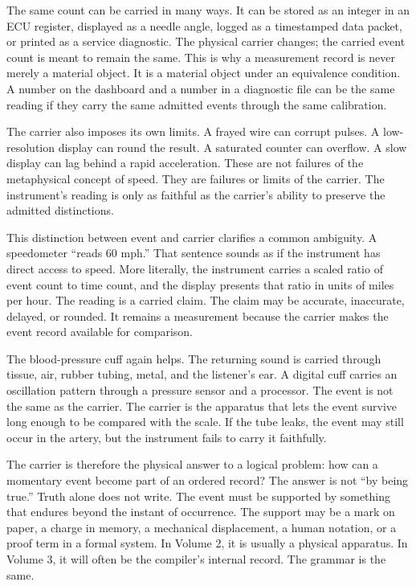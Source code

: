 The same count can be carried in many ways. It can be stored as an integer in an
ECU register, displayed as a needle angle, logged as a timestamped data packet,
or printed as a service diagnostic. The physical carrier changes; the carried
event count is meant to remain the same. This is why a measurement record is
never merely a material object. It is a material object under an equivalence
condition. A number on the dashboard and a number in a diagnostic file can be
the same reading if they carry the same admitted events through the same
calibration.

The carrier also imposes its own limits. A frayed wire can corrupt pulses. A
low-resolution display can round the result. A saturated counter can overflow.
A slow display can lag behind a rapid acceleration. These are not failures of
the metaphysical concept of speed. They are failures or limits of the carrier.
The instrument's reading is only as faithful as the carrier's ability to
preserve the admitted distinctions.

This distinction between event and carrier clarifies a common ambiguity. A
speedometer ``reads 60 mph.'' That sentence sounds as if the instrument has
direct access to speed. More literally, the instrument carries a scaled ratio of
event count to time count, and the display presents that ratio in units of miles
per hour. The reading is a carried claim. The claim may be accurate, inaccurate,
delayed, or rounded. It remains a measurement because the carrier makes the
event record available for comparison.

The blood-pressure cuff again helps. The returning sound is carried through
tissue, air, rubber tubing, metal, and the listener's ear. A digital cuff
carries an oscillation pattern through a pressure sensor and a processor. The
event is not the same as the carrier. The carrier is the apparatus that lets the
event survive long enough to be compared with the scale. If the tube leaks, the
event may still occur in the artery, but the instrument fails to carry it
faithfully.

The carrier is therefore the physical answer to a logical problem: how can a
momentary event become part of an ordered record? The answer is not ``by being
true.'' Truth alone does not write. The event must be supported by something
that endures beyond the instant of occurrence. The support may be a mark on
paper, a charge in memory, a mechanical displacement, a human notation, or a
proof term in a formal system. In Volume 2, it is usually a physical apparatus.
In Volume 3, it will often be the compiler's internal record. The grammar is the
same.

